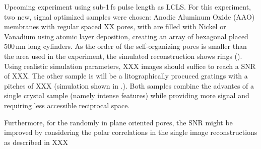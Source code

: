 Upcoming experiment using sub-1\,fs pulse length as LCLS. 
For this experiment, two new, signal optimized samples were chosen: Anodic Aluminum Oxide (AAO) membranes with regular spaced XX pores, with are filled with Nickel or Vanadium using atomic layer deposition, creating an array of hexagonal placed  500\,nm long cylinders. As the order of the self-organizing pores is smaller than the area used in the experiment, the simulated reconstruction shows rings (). Using realistic simulation parameters, XXX images should suffice to reach a SNR of XXX.
The other sample is will be a litographically procuced gratings with a pitches of XXX (simulation shown in .). Both samples combine the advantes of a single crystal sample (namely intense features) while providing more signal and requiring less accessible reciprocal space. 


Furthermore, for the randomly in plane oriented pores, the SNR might be improved by considering the polar correlations in the single image reconstructions as described in XXX


